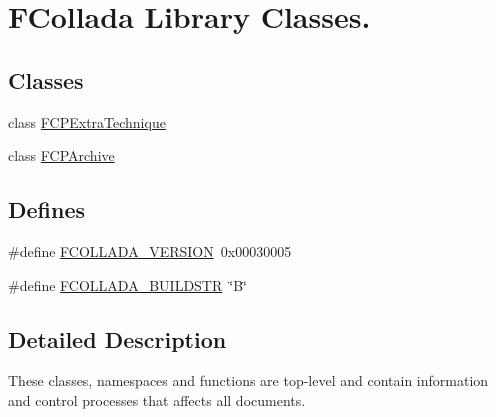 \hypertarget{group__FCollada}{
\section{FCollada Library Classes.}
\label{group__FCollada}
}
\subsection*{Classes}
\begin{DoxyCompactItemize}
\item 
class \hyperlink{classFCPExtraTechnique}{FCPExtraTechnique}
\item 
class \hyperlink{classFCPArchive}{FCPArchive}
\end{DoxyCompactItemize}
\subsection*{Defines}
\begin{DoxyCompactItemize}
\item 
\#define \hyperlink{group__FCollada_ga8c605d8bc3b9e915e61fcfcf53754aac}{FCOLLADA\_\-VERSION}~0x00030005
\item 
\#define \hyperlink{group__FCollada_gae93ce255d6017777d3a5f89bcb8e5eab}{FCOLLADA\_\-BUILDSTR}~\char`\"{}B\char`\"{}
\end{DoxyCompactItemize}


\subsection{Detailed Description}
These classes, namespaces and functions are top-\/level and contain information and control processes that affects all documents. 

